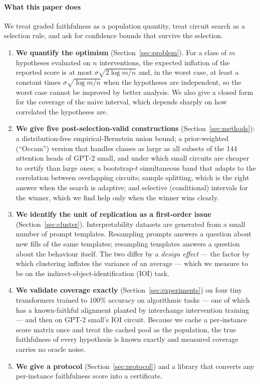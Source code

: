 \paragraph{What this paper does}
We treat graded faithfulness as a population quantity, treat circuit search as a
selection rule, and ask for confidence bounds that survive the selection.

\begin{enumerate}\itemsep2pt
\item \textbf{We quantify the optimism} (Section~\ref{sec:problem}). For a class
of $m$ hypotheses evaluated on $n$ interventions, the expected inflation of the
reported score is at most $\sigma\sqrt{2\log m/n}$ and, in the worst case, at
least a constant times $\sigma\sqrt{\log m / n}$ when the hypotheses are
independent, so the worst case cannot be improved by better analysis. We also give a closed form
for the coverage of the naive interval, which depends sharply on how correlated
the hypotheses are.

\item \textbf{We give five post-selection-valid constructions} (Section~\ref{sec:methods}):
a distribution-free empirical-Bernstein union bound; a prior-weighted (``Occam'')
version that handles classes as large as all subsets of the 144 attention heads
of GPT-2 small, and under which small circuits are cheaper to certify than large
ones; a bootstrap-$t$ simultaneous band that adapts to the correlation between
overlapping circuits; sample splitting, which is the right answer when the search
is adaptive; and selective (conditional) intervals for the winner, which we find
help only when the winner wins clearly.

\item \textbf{We identify the unit of replication as a first-order issue}
(Section~\ref{sec:cluster}). Interpretability datasets are generated from a small
number of prompt templates. Resampling prompts answers a question about new fills
of the same templates; resampling templates answers a question about the
behaviour itself. The two differ by a \emph{design effect} --- the factor by
which clustering inflates the variance of an average --- which we measure to be
\MyIOIDeff{} on the indirect-object-identification (IOI) task.

\item \textbf{We validate coverage exactly} (Section~\ref{sec:experiments}) on
four tiny transformers trained to $100\%$ accuracy on algorithmic tasks --- one
of which has a known-faithful alignment planted by interchange intervention
training --- and then on GPT-2 small's IOI circuit. Because we cache a
per-instance score matrix once and treat the cached pool as the population, the
true faithfulness of every hypothesis is known exactly and measured coverage
carries no oracle noise.

\item \textbf{We give a protocol} (Section~\ref{sec:protocol}) and a library that
converts any per-instance faithfulness score into a certificate.
\end{enumerate}

